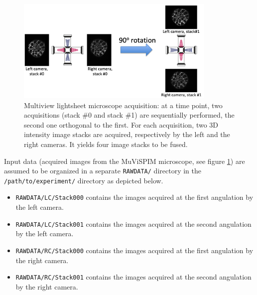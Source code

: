 \begin{figure}
\begin{center}
\includegraphics[height=50mm]{figures/acquisition-spim.png}
\end{center}
\caption{\label{fig:cli:fuse:spim:acquisition} Multiview lightsheet microscope acquisition: at a time point, two acquisitions (stack \#0 and stack \#1) are sequentially performed, the second one orthogonal to the first. For each acquisition, two 3D intensity image stacks are acquired, respectively by the left and the right cameras. 
It yields four image stacks to be fused.}
\end{figure}

Input data (acquired images from the MuViSPIM microscope, see figure \ref{fig:cli:fuse:spim:acquisition}) are assumed
to be organized in a separate \texttt{RAWDATA/} directory in the 
\texttt{/path/to/experiment/} directory as depicted below. 
\begin{itemize}
  \itemsep -0.5ex
\item \texttt{RAWDATA/LC/Stack000} contains the images acquired at the
  first angulation by the left camera.
\item \texttt{RAWDATA/LC/Stack001} contains the images acquired at the
  second angulation by the left camera.
\item \texttt{RAWDATA/RC/Stack000} contains the images acquired at the
  first angulation by the right camera.
\item \texttt{RAWDATA/RC/Stack001} contains the images acquired at the
  second angulation by the right camera.
\end{itemize}

\mbox{}
\mbox{}


